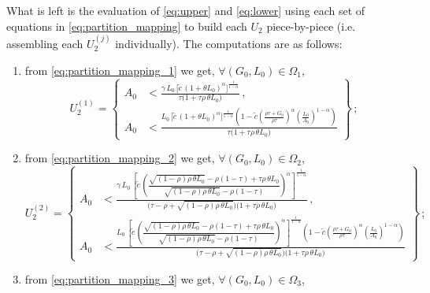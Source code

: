\documentclass[a4paper,fleqn]{cas-sc}
\begin{document}
What is left is the evaluation of \eqref{eq:upper} and \eqref{eq:lower} using each set of equations in \eqref{eq:partition_mapping} to build each $U_2$ piece-by-piece (i.e. assembling each $U_2^{(j)}$ individually).
The computations are as follows:
%
\begin{enumerate}
    \item from \eqref{eq:partition_mapping_1} we get, $\forall (G_0,L_0)\in\Omega_1$,
    \begin{equation}\label{eq:subset_M2_1}
        U_2^{(1)} = \left\{
        \begin{aligned}
            A_0 &< \frac{\gamma\,L_0\,\Big[\tilde{c}\,(1+\theta L_0)^{\alpha}\Big]^{\frac{1}{1-\alpha}}}{\tau\big(1+\tau\rho\,\theta L_0\big)}\,,\\[10pt]
            A_0 &< \frac{L_0\,\Big[\tilde{c}\,(1+\theta L_0)^{\alpha}\Big]^{\frac{1}{1-\alpha}}\left(1-\tilde{c}\left(\frac{\rho\tau+G_0}{\rho\tau}\right)^{\alpha}\left(\frac{L_0}{A_0}\right)^{1-\alpha}\right)}{\tau\big(1+\tau\rho\,\theta L_0\big)}
        \end{aligned}
        \right\}\,;
    \end{equation}
    \item from \eqref{eq:partition_mapping_2} we get, $\forall (G_0,L_0)\in\Omega_2$,
    \begin{equation}\label{eq:subset_M2_2}
        U_2^{(2)} = \left\{
        \begin{aligned}
            A_0 &< \frac{\gamma\,L_0\,\left[\tilde{c}\,\left(\dfrac{\sqrt{(1-\rho)\rho\,\theta L_0} - \rho(1-\tau) + \tau\rho\,\theta L_0}{\sqrt{(1-\rho)\rho\,\theta L_0} - \rho(1-\tau)}\right)^{\alpha}\right]^{\frac{1}{1-\alpha}}}{\Big(\tau-\rho+\sqrt{(1-\rho)\rho\,\theta L_0}\Big)\big(1+\tau\rho\,\theta L_0\big)}\,,\\[10pt]
            A_0 &< \frac{L_0\,\left[\tilde{c}\,\left(\dfrac{\sqrt{(1-\rho)\rho\,\theta L_0} - \rho(1-\tau) + \tau\rho\,\theta L_0}{\sqrt{(1-\rho)\rho\,\theta L_0} - \rho(1-\tau)}\right)^{\alpha}\right]^{\frac{1}{1-\alpha}}\left(1-\tilde{c}\left(\frac{\rho\tau+G_0}{\rho\tau}\right)^{\alpha}\left(\frac{L_0}{A_0}\right)^{1-\alpha}\right)}{\Big(\tau-\rho+\sqrt{(1-\rho)\rho\,\theta L_0}\Big)\big(1+\tau\rho\,\theta L_0\big)}
        \end{aligned}
            \right\}\,;
    \end{equation}
    \item from \eqref{eq:partition_mapping_3} we get, $\forall (G_0,L_0)\in\Omega_3$,
    \begin{equation}\label{eq:subset_M2_3}

\end{equation}
\end{enumerate}
\end{document}

